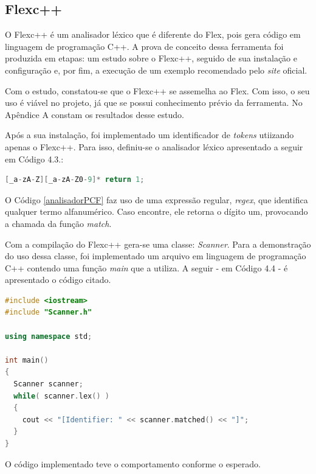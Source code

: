 \subsection{Flexc++} \label{flexcpp}
O Flexc++ é um analisador léxico que é diferente do Flex, pois gera código em linguagem de programação C++. A prova de conceito dessa ferramenta foi produzida em etapas: um estudo sobre o Flexc++, seguido de sua instalação e configuração e, por fim, a execução de um exemplo recomendado pelo \textit{site} oficial.
\par
\indent Com o estudo, constatou-se que o Flexc++ se assemelha ao Flex. Com isso, o seu uso é viável no projeto, já que se possui conhecimento prévio da ferramenta. No Apêndice A constam os resultados desse estudo.
\par
\indent Após a sua instalação, foi implementado um identificador de \textit{tokens} utiizando apenas o Flexc++. Para isso, definiu-se o analisador léxico apresentado a seguir em Código 4.3.:

\begin{lstlisting}[language=C++, label=analisadorPCF, caption={Analisador Léxico da Prova de Conceito do Flexc++}]
%%
[_a-zA-Z][_a-zA-Z0-9]* return 1;
\end{lstlisting}
\par
\indent O Código \ref{analisadorPCF} faz uso de uma expressão regular, \textit{regex}, que identifica qualquer termo alfanumérico. Caso encontre, ele retorna o dígito um, provocando  a chamada da função \textit{match}.
\par
\indent Com a compilação do Flexc++ gera-se uma classe: \textit{Scanner}. Para a demonstração do uso dessa classe, foi implementado um arquivo em linguagem de programação C++ contendo uma função \textit{main} que a utiliza. A seguir - em Código 4.4 - é apresentado o código citado.
\begin{lstlisting}[language=C++, label=mainPCF, caption={Função \textit{main} para demonstração do Flexc++}]
#include <iostream>
#include "Scanner.h"

using namespace std;

int main()
{
  Scanner scanner;
  while( scanner.lex() )
  {
    cout << "[Identifier: " << scanner.matched() << "]";
  }
}
\end{lstlisting}
\par
\indent O código implementado teve o comportamento conforme o esperado.

